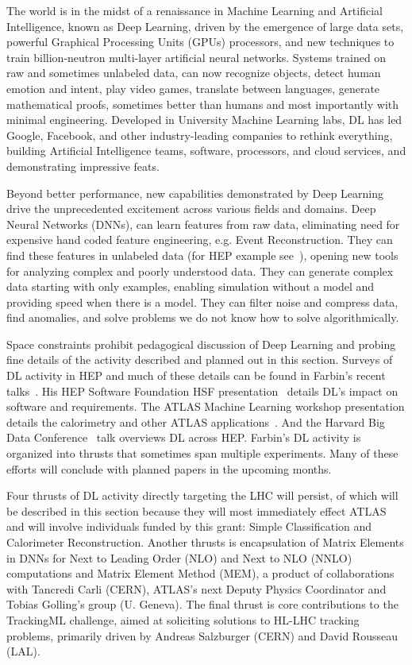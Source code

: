 \label{sec:af_deeplearning}

The world is in the midst of a renaissance in Machine Learning and
Artificial Intelligence, known as Deep Learning, driven by the
emergence of large data sets, powerful Graphical Processing Units
(GPUs) processors, and new techniques to train billion-neutron
multi-layer artificial neural networks. Systems trained on raw and
sometimes unlabeled data, can now recognize objects, detect human
emotion and intent, play video games, translate between languages,
generate mathematical proofs, sometimes better than humans and most
importantly with minimal engineering. Developed in University Machine
Learning labs, DL has led Google, Facebook, and other industry-leading
companies to rethink everything, building Artificial Intelligence
teams, software, processors, and cloud services, and demonstrating
impressive feats.

Beyond better performance, new capabilities demonstrated by Deep
Learning drive the unprecedented excitement across various fields and
domains. Deep Neural Networks (DNNs), can learn features from raw
data, eliminating need for expensive hand coded feature engineering,
e.g. Event Reconstruction. They can find these features in unlabeled
data (for HEP example see~\cite{}), opening new tools for analyzing
complex and poorly understood data. They can generate complex data
starting with only examples, enabling simulation without a model and
providing speed when there is a model. They can filter noise and
compress data, find anomalies, and solve problems we do not know how
to solve algorithmically.

Space constraints prohibit pedagogical discussion of Deep Learning and
probing fine details of the activity described and planned out in this
section. Surveys of DL activity in HEP and much of these details can
be found in Farbin's recent talks~\cite{}. His HEP Software Foundation
HSF presentation~\cite{} details DL's impact on software and
requirements. The ATLAS Machine Learning workshop presentation details
the calorimetry and other ATLAS applications~\cite{}. And the Harvard
Big Data Conference~\cite{} talk overviews DL across HEP. Farbin's DL
activity is organized into thrusts that sometimes span multiple
experiments. Many of these efforts will conclude with planned papers
in the upcoming months. 

Four thrusts of DL activity directly targeting the LHC will persist,
of which will be described in this section because they will most
immediately effect ATLAS and will involve individuals funded by this
grant: Simple Classification and Calorimeter
Reconstruction. Another thrusts is encapsulation of Matrix Elements in
DNNs for Next to Leading Order (NLO) and Next to NLO (NNLO)
computations and Matrix Element Method (MEM), a product of
collaborations with Tancredi Carli (CERN), ATLAS's next Deputy Physics
Coordinator and Tobias Golling's group (U. Geneva). The final thrust
is core contributions to the TrackingML challenge, aimed at soliciting
solutions to HL-LHC tracking problems, primarily driven by Andreas
Salzburger (CERN) and David Rousseau (LAL). 


